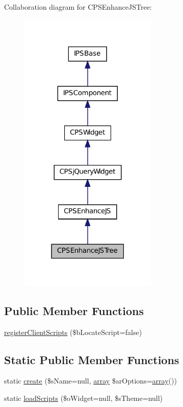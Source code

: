 Collaboration diagram for CPSEnhanceJSTree:\nopagebreak
\begin{figure}[H]
\begin{center}
\leavevmode
\includegraphics[width=186pt]{classCPSEnhanceJSTree__coll__graph}
\end{center}
\end{figure}
\subsection*{Public Member Functions}
\begin{DoxyCompactItemize}
\item 
\hyperlink{classCPSEnhanceJSTree_ac02a66bde8e72e4909137bf748edf665}{registerClientScripts} (\$bLocateScript=false)
\end{DoxyCompactItemize}
\subsection*{Static Public Member Functions}
\begin{DoxyCompactItemize}
\item 
static \hyperlink{classCPSEnhanceJSTree_a0ffc269a208148ade57c7eb608a4562a}{create} (\$sName=null, \hyperlink{list_8php_aa3205d038c7f8feb5c9f01ac4dfadc88}{array} \$arOptions=\hyperlink{list_8php_aa3205d038c7f8feb5c9f01ac4dfadc88}{array}())
\item 
static \hyperlink{classCPSEnhanceJSTree_a561cda05113b81fc962133829351f41e}{loadScripts} (\$oWidget=null, \$sTheme=null)
\end{DoxyCompactItemize}
